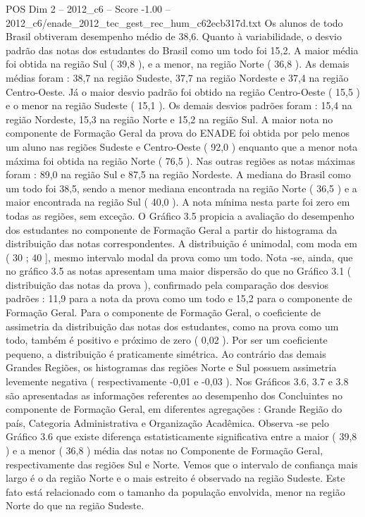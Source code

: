 \begin{textsample}{POS Dim 2 – 2012\_c6 – Score -1.00 – 2012\_c6/enade\_2012\_tec\_gest\_rec\_hum\_c62ecb317d.txt}
Os alunos de todo Brasil obtiveram desempenho médio de 38,6.
Quanto à variabilidade, o desvio padrão das notas dos estudantes do Brasil como um todo foi 15,2.
A maior média foi obtida na região Sul ( 39,8 ), e a menor, na região Norte ( 36,8 ).
As demais médias foram : 38,7 na região Sudeste, 37,7 na região Nordeste e 37,4 na região Centro-Oeste.
Já o maior desvio padrão foi obtido na região Centro-Oeste ( 15,5 ) e o menor na região Sudeste ( 15,1 ).
Os demais desvios padrões foram : 15,4 na região Nordeste, 15,3 na região Norte e 15,2 na região Sul.
A maior nota no componente de Formação Geral da prova do ENADE foi obtida por pelo menos um aluno nas regiões Sudeste e Centro-Oeste ( 92,0 ) enquanto que a menor nota máxima foi obtida na região Norte ( 76,5 ).
Nas outras regiões as notas máximas foram : 89,0 na região Sul e 87,5 na região Nordeste.
A mediana do Brasil como um todo foi 38,5, sendo a menor mediana encontrada na região Norte ( 36,5 ) e a maior encontrada na região Sul ( 40,0 ).
A nota mínima nesta parte foi zero em todas as regiões, sem exceção.
O Gráfico 3.5 propicia a avaliação do desempenho dos estudantes no componente de Formação Geral a partir do histograma da distribuição das notas correspondentes.
A distribuição é unimodal, com moda em ( 30 ; 40 ], mesmo intervalo modal da prova como um todo.
Nota -se, ainda, que no gráfico 3.5 as notas apresentam uma maior dispersão do que no Gráfico 3.1 ( distribuição das notas da prova ), confirmado pela comparação dos desvios padrões : 11,9 para a nota da prova como um todo e 15,2 para o componente de Formação Geral.
Para o componente de Formação Geral, o coeficiente de assimetria da distribuição das notas dos estudantes, como na prova como um todo, também é positivo e próximo de zero ( 0,02 ).
Por ser um coeficiente pequeno, a distribuição é praticamente simétrica.
Ao contrário das demais Grandes Regiões, os histogramas das regiões Norte e Sul possuem assimetria levemente negativa ( respectivamente -0,01 e -0,03 ).
Nos Gráficos 3.6, 3.7 e 3.8 são apresentadas as informações referentes ao desempenho dos Concluintes no componente de Formação Geral, em diferentes agregações : Grande Região do país, Categoria Administrativa e Organização Acadêmica.
Observa -se pelo Gráfico 3.6 que existe diferença estatisticamente significativa entre a maior ( 39,8 ) e a menor ( 36,8 ) média das notas no Componente de Formação Geral, respectivamente das regiões Sul e Norte.
Vemos que o intervalo de confiança mais largo é o da região Norte e o mais estreito é observado na região Sudeste.
Este fato está relacionado com o tamanho da população envolvida, menor na região Norte do que na região Sudeste.

\end{textsample}
